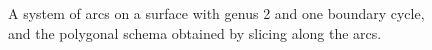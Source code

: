 \documentclass[letterpaper,review]{siamart190516}
\begin{document}
\begin{figure}[htb]
\centering
{}\hfil
{}
\caption{A system of arcs on a surface with genus 2 and one boundary cycle, and the polygonal schema obtained by slicing along the arcs.}
\label{fig:schema}
\end{figure}
\end{document}
